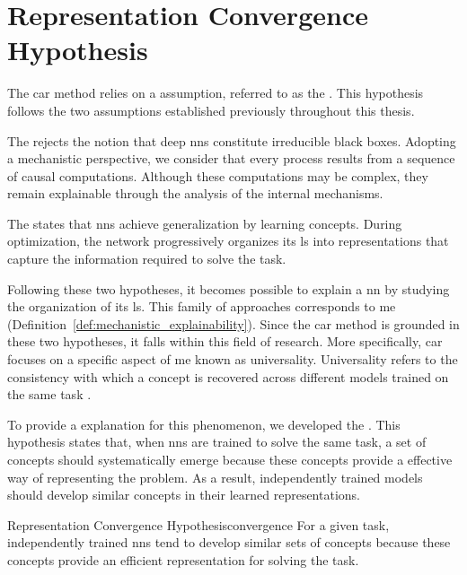 \section{Representation Convergence Hypothesis}
\label{sec:representation_convergence_hypothesis}

The \gls{car} method relies on a assumption, referred to as the \RepresentationConvergenceHypothesisName.
This hypothesis follows the two assumptions established previously throughout this thesis.

The \MechanisticHypothesisName rejects the notion that deep \glspl{nn} constitute irreducible black boxes.
Adopting a mechanistic perspective, we consider that every process results from a sequence of causal computations.
Although these computations may be complex, they remain explainable through the analysis of the internal mechanisms.

The \ConceptHypothesisName states that \glspl{nn} achieve generalization by learning concepts.
During optimization, the network progressively organizes its \gls{ls} into representations that capture the information required to solve the task.

Following these two hypotheses, it becomes possible to explain a \gls{nn} by studying the organization of its \gls{ls}.
This family of approaches corresponds to \gls{me} (Definition~\ref{def:mechanistic_explainability}).
Since the \gls{car} method is grounded in these two hypotheses, it falls within this field of research.
More specifically, \gls{car} focuses on a specific aspect of \gls{me} known as universality.
Universality refers to the consistency with which a concept is recovered across different models trained on the same task \parencite{templeton2024scaling}.

To provide a explanation for this phenomenon, we developed the \RepresentationConvergenceHypothesisName.
This hypothesis states that, when \glspl{nn} are trained to solve the same task, a set of concepts should systematically emerge because these concepts provide a effective way of representing the problem.
As a result, independently trained models should develop similar concepts in their learned representations.

\begin{hypothesis}{Representation Convergence Hypothesis}{convergence}
For a given task, independently trained \glspl{nn} tend to develop similar sets of concepts because these concepts provide an efficient representation for solving the task.
\end{hypothesis}

